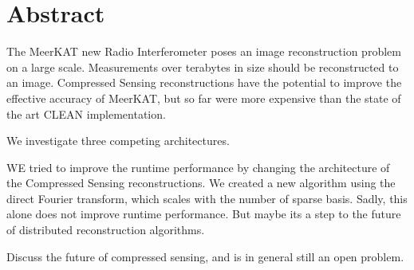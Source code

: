 \section*{Abstract}
The MeerKAT new Radio Interferometer poses an image reconstruction problem on a large scale. Measurements over terabytes in size should be reconstructed to an image. Compressed Sensing reconstructions have the potential to improve the effective accuracy of MeerKAT, but so far were more expensive than the state of the art CLEAN implementation.

We investigate three competing architectures.

WE tried to improve the runtime performance by changing the architecture of the Compressed Sensing reconstructions. We created a new algorithm using the direct Fourier transform, which scales with the number of sparse basis. Sadly, this alone does not improve runtime performance. But maybe its a step to the future of distributed reconstruction algorithms.

Discuss the future of compressed sensing, and is in general still an open problem.